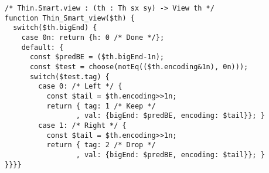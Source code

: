 


\begin{verbatim}
/* Thin.Smart.view : (th : Th sx sy) -> View th */
function Thin_Smart_view($th) {
  switch($th.bigEnd) {
    case 0n: return {h: 0 /* Done */};
    default: {
      const $predBE = ($th.bigEnd-1n);
      const $test = choose(notEq(($th.encoding&1n), 0n)));
      switch($test.tag) {
        case 0: /* Left */ {
          const $tail = $th.encoding>>1n;
          return { tag: 1 /* Keep */
                 , val: {bigEnd: $predBE, encoding: $tail}}; }
        case 1: /* Right */ {
          const $tail = $th.encoding>>1n;
          return { tag: 2 /* Drop */
                 , val: {bigEnd: $predBE, encoding: $tail}}; }
}}}}
\end{verbatim}
